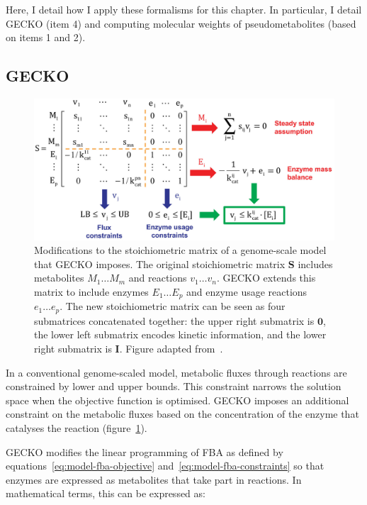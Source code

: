 Here, I detail how I apply these formalisms for this chapter.
In particular, I detail GECKO (item 4) and computing molecular weights of pseudometabolites (based on items 1 and 2).


\subsection{GECKO}
\label{subsec:model-yeast8-gecko}

\begin{figure}
  \centering
  \includegraphics[width=0.9\linewidth]{sanchezImprovingPhenotypePredictions2017_1b_adapted}
  \caption[
    Modifications to the stoichiometric matrix of a genome-scale model that GECKO imposes
  ]{
    Modifications to the stoichiometric matrix of a genome-scale model that GECKO imposes.
    The original stoichiometric matrix $\mathbf{S}$ includes metabolites $M_{1} \ldots M_{m}$ and reactions $v_{1} \ldots v_{n}$.
    GECKO extends this matrix to include enzymes $E_{1} \ldots E_{p}$ and enzyme usage reactions $e_{1} \ldots e_{p}$.
    The new stoichiometric matrix can be seen as four submatrices concatenated together: the upper right submatrix is $\mathbf{0}$, the lower left submatrix encodes kinetic information, and the lower right submatrix is $\mathbf{I}$.
    Figure adapted from~\textcite{sanchezImprovingPhenotypePredictions2017}.
  }
  \label{fig:model-gecko}
\end{figure}

In a conventional genome-scaled model, metabolic fluxes through reactions are constrained by lower and upper bounds.
This constraint narrows the solution space when the objective function is optimised.
GECKO imposes an additional constraint on the metabolic fluxes based on the concentration of the enzyme that catalyses the reaction (figure~\ref{fig:model-gecko}).

GECKO modifies the linear programming of FBA as defined by equations~\ref{eq:model-fba-objective} and~\ref{eq:model-fba-constraints} so that enzymes are expressed as metabolites that take part in reactions.
In mathematical terms, this can be expressed as:

